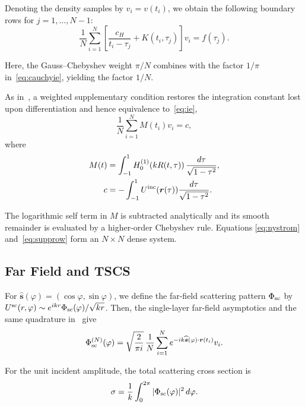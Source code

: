 \documentclass[conference]{IEEEtran}
\begin{document}
Denoting the density samples by $v_i=v(t_i)$, we obtain the following
boundary rows for $j=1,\ldots,N-1$:
\begin{equation}
 \frac{1}{N}\sum_{i=1}^{N}
 \left[\frac{c_H}{t_i-\tau_j}+K(t_i,\tau_j)\right]v_i=f(\tau_j).
 \label{eq:nystrom}
\end{equation}

Here, the Gauss--Chebyshev weight $\pi/N$ combines with the factor $1/\pi$
in~\eqref{eq:cauchyie}, yielding the factor $1/N$.

As in~\cite{nosich2005,nosich2007}, a weighted supplementary condition restores
the integration constant lost upon differentiation and hence equivalence
to~\eqref{eq:ie},
\begin{equation}
 \frac{1}{N}\sum_{i=1}^{N}M(t_i)v_i=c,                                  \label{eq:supprow}
\end{equation}
where
\begin{align}
 M(t)&=\int_{-1}^{1}H_0^{(1)}\!\left(kR(t,\tau)\right)
          \frac{d\tau}{\sqrt{1-\tau^2}},                                \label{eq:mdef}\\
 c&=-\int_{-1}^{1}U^{\rm inc}(\boldsymbol r(\tau))
          \frac{d\tau}{\sqrt{1-\tau^2}}.                               \label{eq:cdef}
\end{align}

The logarithmic self term in $M$ is subtracted analytically and its smooth
remainder is evaluated by a higher-order Chebyshev rule.  Equations
\eqref{eq:nystrom} and~\eqref{eq:supprow} form an $N\times N$ dense system.

\subsection{Far Field and TSCS}

For $\widehat{\boldsymbol s}(\varphi)=(\cos\varphi,\sin\varphi)$, we define
the far-field scattering pattern $\Phi_{\rm sc}$ by
$U^{\rm sc}(r,\varphi)\sim e^{ikr}\Phi_{\rm sc}(\varphi)/\sqrt{kr}$.
Then, the single-layer far-field asymptotics and the same quadrature
in~\cite{nosich2007} give
\begin{equation}
 \Phi_{\rm sc}^{(N)}(\varphi)
 =\sqrt{\frac{2}{\pi i}}\,\frac{1}{N}\sum_{i=1}^{N}
 e^{-ik\widehat{\boldsymbol s}(\varphi)\cdot\boldsymbol r(t_i)}v_i.
 \label{eq:farfield}
\end{equation}

For the unit incident amplitude, the total scattering cross section is
\begin{equation}
 \sigma=\frac{1}{k}\int_{0}^{2\pi}|\Phi_{\rm sc}(\varphi)|^2\,d\varphi.
 \label{eq:tscs}
\end{equation}
\end{document}
